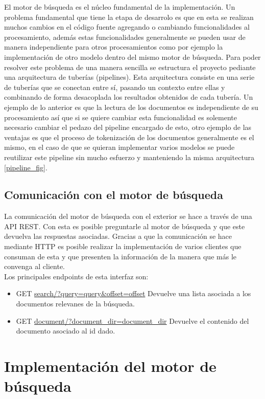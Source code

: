 \documentclass[runningheads]{llncs}
\begin{document}
El motor de búsqueda es el núcleo fundamental de la implementación. Un problema fundamental que
tiene la etapa de desarrolo es que en esta se realizan muchos cambios en el código fuente agregando
o cambiando funcionalidades al procesamiento, además estas funcionalidades generalmente se pueden usar
de manera independiente para otros procesamientos como por ejemplo la implementación de otro modelo
dentro del mismo motor de búsqueda. Para poder resolver este problema de una manera sencilla se estructura
el proyecto pediante una arquitectura de tuberías (pipelines). Esta arquitectura consiste en una serie
de tuberías que se conectan entre sí, pasando un contexto entre ellas y combinando de forma desacoplada
los resultados obtenidos de cada tubería. Un ejemplo de lo anterior es que la lectura de los documentos
es independiente de su procesamiento así que si se quiere cambiar esta funcionalidad es solemente necesario
cambiar el pedazo del pipeline encargado de esto, otro ejemplo de las ventajas es que el proceso de
tokenización de los documentos generalmente es el mismo, en el caso de que se quieran implementar varios
modelos se puede reutilizar este pipeline sin mucho esfuerzo y manteniendo la misma arquitectura \ref{pipeline_fig}.

\subsection{Comunicación con el motor de búsqueda}

La comunicación del motor de búsqueda con el exterior se hace a través de una API REST. Con esta
es posible preguntarle al motor de búsqueda y que este devuelva las respuestas asociadas. Gracias
a que la comunicación se hace mediante HTTP es posible realizar la implementación de varios clientes
que consuman de esta y que presenten la información de la manera que más le convenga al cliente.\\

Los principales endpoints de esta interfaz son:

\begin{itemize}
    \item GET \url{search/?query=query\&offset=offset} Devuelve una lista asociada a los
documentos relevanes de la búsqueda.
    \item GET \url{document/?document\_dir=document\_dir} Devuelve el contenido del documento asociado
al id dado.
\end{itemize}

\section{Implementación del motor de búsqueda}
\end{document}
